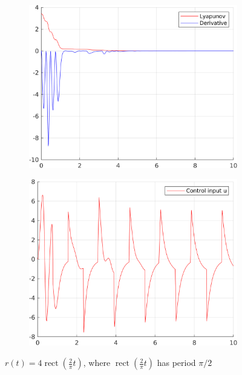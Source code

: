 \documentclass[12pt,a4paper]{article}
\begin{document}
\begin{figure}[H]
\begin{subfigure}{.45\textwidth}
				\includegraphics[width=1\textwidth]{Graphics/LinearLyapunov3.png}
			\end{subfigure}%
			\begin{subfigure}{.45\textwidth}
				\centering
				\includegraphics[width=1\textwidth]{Graphics/LinearControl3.png}
			\end{subfigure}
		\caption{$r(t) = 4\operatorname{rect}(\frac{2}{\pi}t)$, where $\operatorname{rect}(\frac{2}{\pi}t)$ has period $\pi/2$}
		\label{fig:rect1}
		\end{figure}
	
\end{document}
